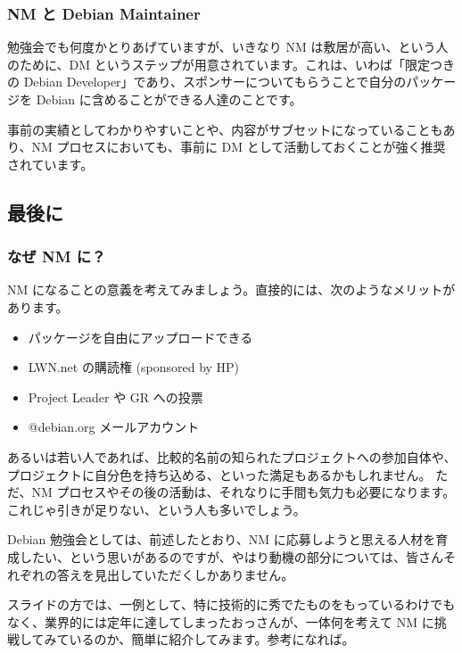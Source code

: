 \documentclass[mingoth,a4paper]{jsarticle}
\begin{document}
\subsubsection{NM と Debian Maintainer}

勉強会でも何度かとりあげていますが、いきなり NM は敷居が高い、という人のために、DM というステップが用意されています。これは、いわば「限定つきの Debian Developer」であり、スポンサーについてもらうことで自分のパッケージを Debian に含めることができる人達のことです。

事前の実績としてわかりやすいことや、内容がサブセットになっていることもあり、NM プロセスにおいても、事前に DM として活動しておくことが強く推奨されています。

\subsection{最後に}

\subsubsection{なぜ NM に？}

NM になることの意義を考えてみましょう。直接的には、次のようなメリットがあります。

\begin{itemize}
\item パッケージを自由にアップロードできる
\item LWN.net の購読権 (sponsored by HP)
\item Project Leader や GR への投票
\item @debian.org メールアカウント
\end{itemize}

あるいは若い人であれば、比較的名前の知られたプロジェクトへの参加自体や、プロジェクトに自分色を持ち込める、といった満足もあるかもしれません。
ただ、NM プロセスやその後の活動は、それなりに手間も気力も必要になります。これじゃ引きが足りない、という人も多いでしょう。

Debian 勉強会としては、前述したとおり、NM に応募しようと思える人材を育成したい、という思いがあるのですが、やはり動機の部分については、皆さんそれぞれの答えを見出していただくしかありません。

スライドの方では、一例として、特に技術的に秀でたものをもっているわけでもなく、業界的には定年に達してしまったおっさんが、一体何を考えて NM に挑戦してみているのか、簡単に紹介してみます。参考になれば。

\clearpage
\end{document}
